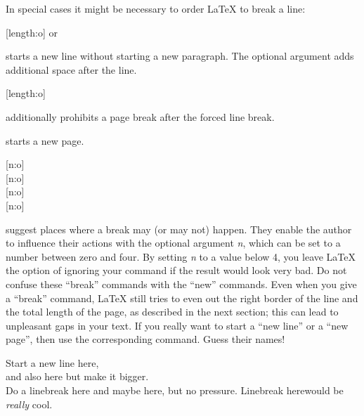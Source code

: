 In special cases it might be necessary to order \LaTeX{} to break a
line:
\begin{lscommand}
  \csi{\bs}[length:o] or 
\end{lscommand}
starts a new line without starting a new paragraph. The optional 
argument adds additional space after the line.

\begin{lscommand}
  \csi{\bs*}[length:o]
\end{lscommand}
additionally prohibits a page break after the forced line break.

\begin{lscommand}
\end{lscommand}
starts a new page.

\begin{lscommand}
  [n:o] \\
  [n:o] \\
  [n:o] \\
  [n:o]
\end{lscommand}
suggest places where a break may (or may not) happen.
They enable the author to influence their
actions with the optional argument \emph{n}, which can be set to a number
between zero and four. By setting \emph{n} to a value below 4, you leave
\LaTeX{} the option of ignoring your command if the result would look very
bad. Do not confuse these ``break'' commands with the ``new'' commands. Even
when you give a ``break'' command, \LaTeX{} still tries to even out the
right border of the line and the total length of the page, as described in
the next section; this can lead to unpleasant gaps in your text.
If you really want to start a ``new line'' or a ``new page'', then use the
corresponding command. Guess their names!
\begin{example}[examplewidth=0.4\linewidth]
  Start a new line here,\\
  and also here but make
  it bigger.\\[1cm]
  Do a linebreak here\linebreak
  and maybe here, \linebreak[1]
  but no pressure.
  Linebreak here\linebreak[3]
  would be \emph{really} cool. 
\end{example}

